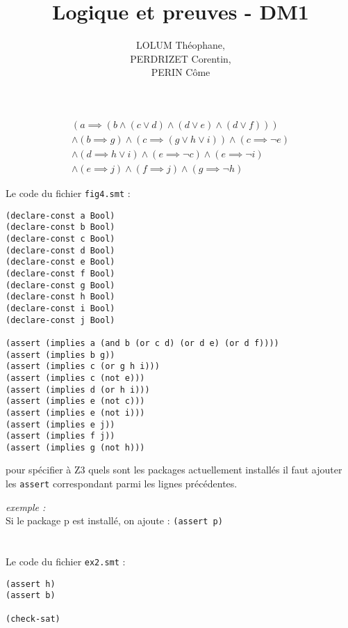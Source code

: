 \documentclass{article}
\title{Logique et preuves - DM1}
\author{LOLUM Théophane, \\PERDRIZET Corentin, \\PERIN Côme}
\begin{document}
\maketitle

\section{}


\begin{align*}
    (a\implies(b\land (c\lor d)\land(d \lor e)\land(d \lor f))) \\
    \land(b\implies g)\land(c\implies(g\lor h\lor i))\land(c\implies \neg e) \\
    \land(d\implies h\lor i)\land(e \implies\neg c)\land(e\implies\neg i) \\
    \land(e\implies j)\land(f\implies j)\land(g\implies\neg h)
\end{align*}

\lstset{language=Verilog}

Le code du fichier \texttt{fig4.smt} :
    \begin{lstlisting}
(declare-const a Bool)
(declare-const b Bool)
(declare-const c Bool)
(declare-const d Bool)
(declare-const e Bool)
(declare-const f Bool)
(declare-const g Bool)
(declare-const h Bool)
(declare-const i Bool)
(declare-const j Bool)

(assert (implies a (and b (or c d) (or d e) (or d f))))
(assert (implies b g))
(assert (implies c (or g h i)))
(assert (implies c (not e)))
(assert (implies d (or h i)))
(assert (implies e (not c)))
(assert (implies e (not i)))
(assert (implies e j))
(assert (implies f j))
(assert (implies g (not h)))
    \end{lstlisting}
    
pour spécifier à Z3 quels sont les packages actuellement installés il faut ajouter les \texttt{assert} correspondant parmi les lignes précédentes.
    
\textit{exemple : }\\
Si le package p est installé, on ajoute : \texttt{(assert p)}


\section{}
Le code du fichier \texttt{ex2.smt} : 
\begin{lstlisting}
(assert h)
(assert b)

(check-sat)
\end{lstlisting}
\end{document}
